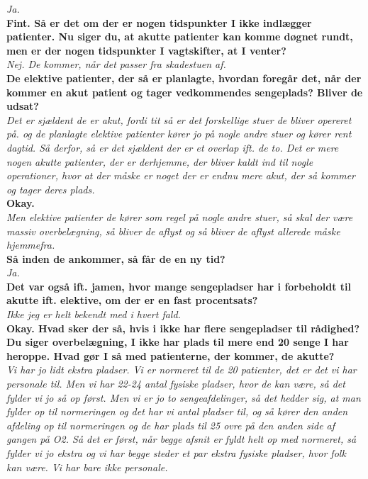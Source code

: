 \noindent
\textit{Ja.} \\
\noindent
\textbf{Fint. Så er det om der er nogen tidspunkter I ikke indlægger patienter. Nu siger du, at akutte patienter kan komme døgnet rundt, men er der nogen tidspunkter I vagtskifter, at I venter?} \\
\noindent
\textit{Nej. De kommer, når det passer fra skadestuen af.} \\
\noindent
\textbf{De elektive patienter, der så er planlagte, hvordan foregår det, når der kommer en akut patient og tager vedkommendes sengeplads? Bliver de udsat?} \\
\noindent
\textit{Det er sjældent de er akut, fordi tit så er det forskellige stuer de bliver opereret på. og de planlagte elektive patienter kører jo på nogle andre stuer og kører rent dagtid. Så derfor, så er det sjældent der er et overlap ift. de to. Det er mere nogen akutte patienter, der er derhjemme, der bliver kaldt ind til nogle operationer, hvor at der måske er noget der er endnu mere akut, der så kommer og tager deres plads.} \\
\noindent
\textbf{Okay.} \\
\noindent
\textit{Men elektive patienter de kører som regel på nogle andre stuer, så skal der være massiv overbelægning, så bliver de aflyst og så bliver de aflyst allerede måske hjemmefra.} \\
\noindent
\textbf{Så inden de ankommer, så får de en ny tid?} \\
\noindent
\textit{Ja.} \\
\noindent
\textbf{Det var også ift. jamen, hvor mange sengepladser har i forbeholdt til akutte ift. elektive, om der er en fast procentsats?} \\
\noindent
\textit{Ikke jeg er helt bekendt med i hvert fald.} \\
\noindent
\textbf{Okay. Hvad sker der så, hvis i ikke har flere sengepladser til rådighed? Du siger overbelægning, I ikke har plads til mere end 20 senge I har heroppe. Hvad gør I så med patienterne, der kommer, de akutte?} \\
\noindent
\textit{Vi har jo lidt ekstra pladser. Vi er normeret til de 20 patienter, det er det vi har personale til. Men vi har 22-24 antal fysiske pladser, hvor de kan være, så det fylder vi jo så op først. Men vi er jo to sengeafdelinger, så det hedder sig, at man fylder op til normeringen og det har vi antal pladser til, og så kører den anden afdeling op til normeringen og de har plads til 25 ovre på den anden side af gangen på O2. Så det er først, når begge afsnit er fyldt helt op med normeret, så fylder vi jo ekstra og vi har begge steder et par ekstra fysiske pladser, hvor folk kan være. Vi har bare ikke personale.} \\

